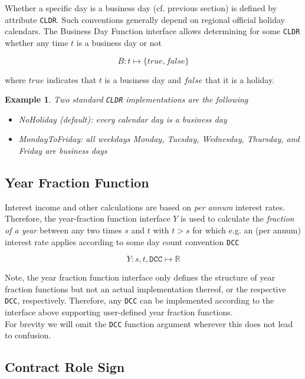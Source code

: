 \documentclass[9pt,oneside]{amsart}
\newtheorem{example}{Example}
\newcommand{\Real}{\mathbb{R}}
\newcommand{\attr}[1]{\texttt{#1}}
\newcommand{\yfrfunc}{Y}
\begin{document}
\begin{multicols}{2}
Whether a specific day is a business day (cf. previous section) is defined by attribute \attr{CLDR}. Such conventions generally depend on regional official holiday calendars. The Business Day Function interface allows determining for some \attr{CLDR} whether any time $t$ is a business day or not

\[
	B: t \mapsto \{true, false\}
\]

where $true$ indicates that $t$ is a business day and $false$ that it is a holiday.


\begin{example}
Two standard \attr{CLDR} implementations are the following
\begin{itemize}
	\item NoHoliday (default): every calendar day is a business day

	\item MondayToFriday: all weekdays Monday, Tuesday, Wednesday, Thursday, and Friday are business days
\end{itemize}
\end{example}


\subsection{Year Fraction Function}

Interest income and other calculations are based on \textit{per annum} interest rates. Therefore, the year-fraction function interface $Y$ is used to calculate the \textit{fraction of a year} between any two times $s$ and $t$ with $t>s$ for which e.g. an (per annum) interest rate applies according to some day count convention \attr{DCC}

\[
	\yfrfunc: s,t,\attr{DCC} \mapsto \Real
\]

Note, the year fraction function interface only defines the structure of year fraction functions but not an actual implementation thereof, or the respective \attr{DCC}, respectively. Therefore, any \attr{DCC} can be implemented according to the interface above supporting user-defined year fraction functions.\\

For brevity we will omit the \attr{DCC} function argument wherever this does not lead to confusion.


\subsection{Contract Role Sign}


\end{multicols}
\end{document}
